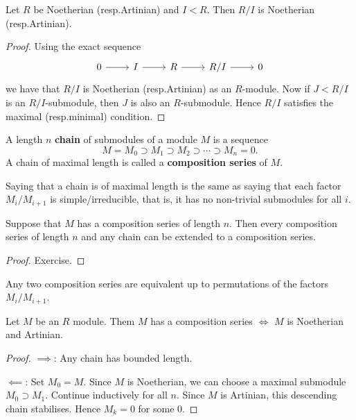 \begin{prop}[3.7]
  Let $R$ be Noetherian (resp.\@ Artinian) and $I<R$.
  Then $R/I$ is Noetherian (resp.\@ Artinian).
\end{prop}

\begin{proof}
  Using the exact sequence
  \begin{equation*}
    \begin{tikzcd}
      0 \ar[r] & I \ar[r] & R \ar[r] & R/I \ar[r] & 0
    \end{tikzcd}
  \end{equation*}
  we have that $R/I$ is Noetherian (resp.\@ Artinian) as an $R$-module.
  Now if $J<R/I$ is an $R/I$-submodule, then $J$ is also an $R$-submodule.
  Hence $R/I$ satisfies the maximal (resp.\@ minimal) condition.
\end{proof}

\begin{defn}
  A length $n$ \textbf{chain} of submodules of a module $M$ is a sequence
  \[ M = M_0 \supset M_1 \supset M_2 \supset \cdots \supset M_n=0. \]
  A chain of maximal length is called a \textbf{composition series} of $M$.
\end{defn}

\begin{rmk}
  Saying that a chain is of maximal length is the same as saying that each factor $M_i/M_{i+1}$ is simple/irreducible, that is, it has no non-trivial submodules for all $i$.
\end{rmk}

\begin{prop}[3.9]
  Suppose that $M$ has a composition series of length $n$.  
  Then every composition series of length $n$ and any chain can be extended to a composition series.
\end{prop}

\begin{proof}
  Exercise.
\end{proof}

\begin{rmk}
  Any two composition series are equivalent up to permutations of the factors $M_i/M_{i+1}$.
\end{rmk}

\begin{prop}[3.10]
  Let $M$ be an $R$ module.
  Them $M$ has a composition series $\iff$ $M$ is Noetherian and Artinian.
\end{prop}

\begin{proof}
  $\implies$:
  Any chain has bounded length.

  $\impliedby$:
  Set $M_0=M$.
  Since $M$ is Noetherian, we can choose a maximal submodule $M_0 \supset M_1$.
  Continue inductively for all $n$.
  Since $M$ is Artinian, this descending chain stabilises.
  Hence $M_k=0$ for some $0$.
\end{proof}

